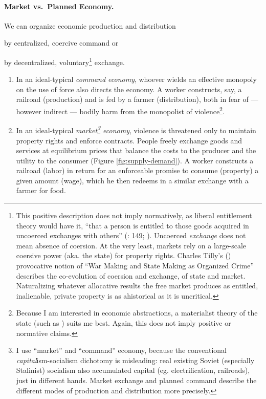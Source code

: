 \paragraph{Market vs.\ Planned Economy.} \label{sec:marketvscommand} We can organize economic production and distribution \begin{inparaenum}[1)]
		\item by centralized, coercive command or
		\item by decentralized, voluntary\footnote{
				\label{fn:tilly}This positive description does not imply normatively, as liberal entitlement theory would have it, ``that a person is entitled to those goods acquired in uncoerced exchanges with others'' (\citealt{Nozick1974}: 149; \citealt{Friedman1962}). Uncoerced \emph{exchange} does not mean absence of coersion.
				At the very least, markets rely on a large-scale coersive power (aka. the state) for property rights.
				Charles Tilly's (\citeyear{Tilly-1985-aa}) provocative notion of ``War Making and State Making as Organized Crime'' describes the co-evolution of coersion and exchange, of state and market.
				Naturalizing whatever allocative results the free market produces as entitled, inalienable, private property is as ahistorical as it is uncritical.}
			exchange. \end{inparaenum}
	\begin{enumerate}
		\item In an ideal-typical \cite{Weber-1920-aa} \emph{command economy}, whoever wields an effective monopoly on the use of force also directs the economy.
		A worker constructs, say, a railroad (production) and is fed by a farmer (distribution), both in fear of --- however indirect --- bodily harm from the monopolist of violence\footnote{
				Because I am  interested in economic abstractions, a materialist theory of the state (such as \citealt{Tilly-1985-aa}) suits me best. Again, this does not imply positive or normative claims.}.
		\item In an ideal-typical \emph{market\footnote{
				I use ``market'' and ``command'' economy, because the conventional \emph{capital}ism-socialism dichotomy is misleading:
				real existing Soviet (especially Stalinist) socialism also accumulated capital (eg. electrification, railroads), just in different hands.
				Market exchange and planned command describe the different modes of production and distribution more precisely.}
			economy}, violence is threatened only to maintain property rights and enforce contracts.
			People freely exchange goods and services at equilibrium prices that balance the costs to the producer and the utility to the consumer (Figure \ref{fig:supply-demand}).
			A worker constructs a railroad (labor) in return for an enforceable promise to consume (property) a given amount (wage), which he then redeems in a similar exchange with a farmer for food.
	\end{enumerate}

